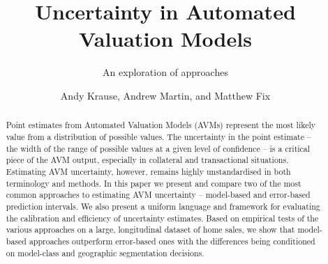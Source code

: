 \documentclass[colTwo]{format}
\theoremstyle{definition}
\begin{document}

\title{Uncertainty in Automated Valuation Models}

\subtitle{An exploration of approaches} 
 	
\author{Andy Krause, Andrew Martin, and Matthew Fix}



\CCbY

\begin{abstracts}
\begin{abstract}
Point estimates from Automated Valuation Models (AVMs) represent the most likely value from a distribution of possible values. The uncertainty in the point estimate -- the width of the range of possible values at a given level of confidence -- is a critical piece of the AVM output, especially in collateral and transactional situations. Estimating AVM uncertainty, however, remains highly unstandardised in both terminology and methods. In this paper we present and compare two of the most common approaches to estimating AVM uncertainty -- model-based and error-based prediction intervals. We also present a uniform language and framework for evaluating the calibration and efficiency of uncertainty estimates. Based on empirical tests of the various approaches on a large, longitudinal dataset of home sales, we show that model-based approaches outperform error-based ones with the differences being conditioned on model-class and geographic segmentation decisions. 

\end{abstract}

\end{abstracts}

\maketitle
 
\end{document}
